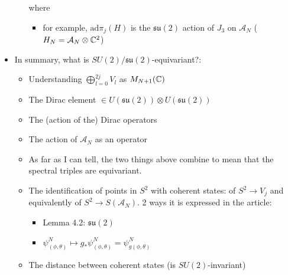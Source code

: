 \documentclass{article}
\newcommand{\sut}{\ensuremath{\mathfrak{su}(2)}}
\begin{document}
\begin{itemize}
\begin{itemize}
        where 
            \begin{itemize}
            
            \item for example, $\text{ad}\pi_j(H)$ is the $\sut$ action of $J_3$ on $\mathcal A_N$ ($H_N = \mathcal A_N \otimes \mathbb{C}^2$)
            
            \end{itemize}
        
        \end{itemize}
    
    \item In summary, what is $SU(2)/\sut$-equivariant?:
    
        \begin{itemize}
            
        \item Understanding $\bigoplus_{l = 0}^{2j} V_l$ as $M_{N+1}(\mathbb{C})$
        
        \item The Dirac element $\in U(\sut) \otimes U(\sut)$
        
        \item The (action of the) Dirac operators
        
        \item The action of $\mathcal A_N$ as an operator

        \item As far as I can tell, the two things above combine to mean that the spectral triples are equivariant.
        
        \item The identification of points in $S^2$ with coherent states: of $S^2 \to V_j$ and equivalently of $S^2 \to S(\mathcal A_N)$. 2 ways it is expressed in the article:
        
            \begin{itemize}
                
            \item Lemma 4.2: $\sut$
            
            \item $\psi^N_{(\phi, \theta)} \mapsto g_* \psi^N_{(\phi, \theta)} = \psi^N_{g(\phi, \theta)}$    
            
            \end{itemize}
        
        \item The distance between coherent states (is $SU(2)$-invariant)
            

\end{itemize}
\end{itemize}
\end{document}
